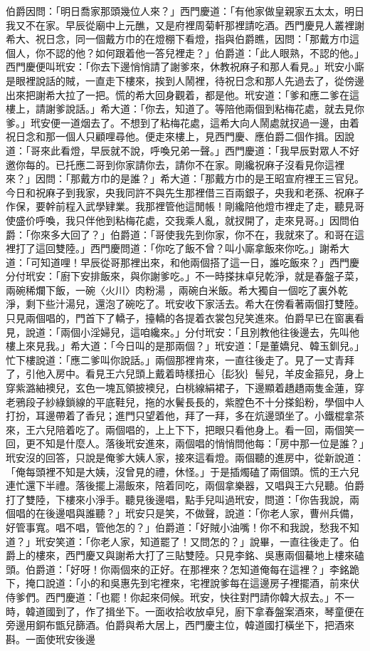 伯爵因問：「明日喬家那頭幾位人來？」西門慶道：「有他家做皇親家五太太，明日我又不在家。早辰從廟中上元醮，又是府裡周菊軒那裡請吃酒。西門慶見人叢裡謝希大、祝日念，同一個戴方巾的在燈棚下看燈，指與伯爵瞧，因問：「那戴方巾這個人，你不認的他？如何跟着他一答兒裡走？」伯爵道：「此人眼熟，不認的他。」西門慶便叫玳安：「你去下邊悄悄請了謝爹來，休教祝麻子和那人看見。」玳安小廝是眼裡說話的賊，一直走下樓來，挨到人鬧裡，待祝日念和那人先過去了，從傍邊出來把謝希大拉了一把。慌的希大回身觀着，都是他。玳安道：「爹和應二爹在這樓上，請謝爹說話。」希大道：「你去，知道了。等陪他兩個到粘梅花處，就去見你爹。」玳安便一道烟去了。不想到了粘梅花處，這希大向人鬧處就扠過一邊，由着祝日念和那一個人只顧哩尋他。便走來樓上，見西門慶、應伯爵二個作揖。因說道：「哥來此看燈，早辰就不說，呼喚兄弟一聲。」西門慶道：「我早辰對眾人不好邀你每的。已托應二哥到你家請你去，請你不在家。剛纔祝麻子沒看見你這裡來？」因問：「那戴方巾的是誰？」希大道：「那戴方巾的是王昭宣府裡王三官兒。今日和祝麻子到我家，央我同許不與先生那裡借三百兩銀子，央我和老孫、祝麻子作保，要幹前程入武學肄業。我那裡管他這閒帳！剛纔陪他燈市裡走了走，聽見哥使盛价呼喚，我只伴他到粘梅花處，交我乘人亂，就扠開了，走來見哥。」因問伯爵：「你來多大回了？」伯爵道：「哥使我先到你家，你不在，我就來了。和哥在這裡打了這回雙陸。」西門慶問道：「你吃了飯不曾？叫小廝拿飯來你吃。」謝希大道：「可知道哩！早辰從哥那裡出來，和他兩個搭了這一日，誰吃飯來？」西門慶分付玳安：「廚下安排飯來，與你謝爹吃。」不一時搽抹卓兒乾淨，就是春盤子菜，兩碗稀爛下飯，一碗〈火川〉肉粉湯 ，兩碗白米飯。希大獨自一個吃了裏外乾淨，剩下些汁湯兒，還泡了碗吃了。玳安收下家活去。希大在傍看著兩個打雙陸。只見兩個唱的，門首下了轎子，擡轎的各提着衣裳包兒笑進來。伯爵早已在窗裏看見，說道：「兩個小淫婦兒，這咱纔來。」分付玳安：「且別教他往後邊去，先叫他樓上來見我。」希大道：「今日叫的是那兩個？」玳安道：「是董嬌兒、韓玉釧兒。」忙下樓說道：「應二爹叫你說話。」兩個那裡肯來，一直往後走了。見了一丈青拜了，引他入房中。看見王六兒頭上戴着時樣扭心｛髟狄｝髻兒，羊皮金箍兒，身上穿紫潞紬襖兒，玄色一塊瓦領披襖兒，白桃線絹裙子，下邊顯着趫趫兩隻金蓮，穿老鴉段子紗綠鎖線的平底鞋兒，拖的水鬢長長的，紫膛色不十分搽鉛粉，學個中人打扮，耳邊帶着了香兒；進門只望着他，拜了一拜，多在炕邊頭坐了。小鐵棍拿茶來，王六兒陪着吃了。兩個唱的，上上下下，把眼只看他身上。看一回，兩個笑一回，更不知是什麼人。落後玳安進來，兩個唱的悄悄問他每：「房中那一位是誰？」玳安沒的回答，只說是俺爹大姨人家，接來這看燈。兩個聽的進房中，從新說道：「俺每頭裡不知是大姨，沒曾見的禮，休怪。」于是插燭磕了兩個頭。慌的王六兒連忙還下半禮。落後擺上湯飯來，陪着同吃，兩個拿樂器，又唱與王六兒聽。伯爵打了雙陸，下樓來小淨手。聽見後邊唱，點手兒叫過玳安，問道：「你告我說，兩個唱的在後邊唱與誰聽？」玳安只是笑，不做聲，說道：「你老人家，曹州兵備，好管事寬。唱不唱，管他怎的？」伯爵道：「好賊小油嘴！你不和我說，愁我不知道？」玳安笑道：「你老人家，知道罷了！又問怎的？」說畢，一直往後走了。伯爵上的樓來，西門慶又與謝希大打了三貼雙陸。只見李銘、吳惠兩個驀地上樓來磕頭。伯爵道：「好呀！你兩個來的正好。在那裡來？怎知道俺每在這裡？」李銘跪下，掩口說道：「小的和吳惠先到宅裡來，宅裡說爹每在這邊房子裡擺酒，前來伏侍爹們。西門慶道：「也罷！你起來伺候。玳安，快往對門請你韓大叔去。」不一時，韓道國到了，作了揖坐下。一面收拾收放卓兒，廚下拿春盤案酒來，琴童便在旁邊用銅布甑兒篩酒。伯爵與希大居上，西門慶主位，韓道國打橫坐下，把酒來斟。一面使玳安後邊
